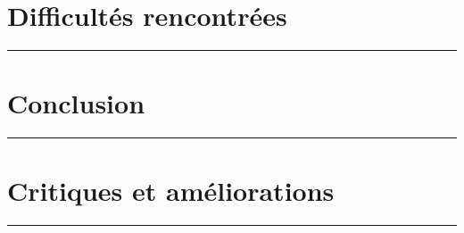 \documentclass[10pt,letterpaper]{article}
\begin{document}
\newpage
\section{Difficultés rencontrées}
\hrule
\vspace{1em}



\newpage
\section{Conclusion}
\hrule
\vspace{1em}



\newpage
\section{Critiques et améliorations}
\hrule
\vspace{1em}
\end{document}
